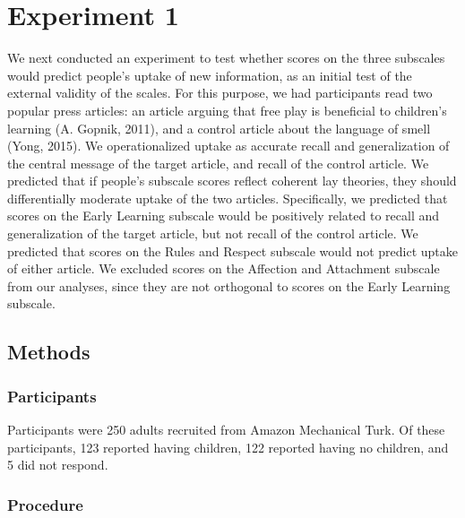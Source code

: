 \documentclass[10pt, letterpaper]{article}
\begin{document}
\section{Experiment 1}\label{experiment-1}

We next conducted an experiment to test whether scores on the three
subscales would predict people's uptake of new information, as an
initial test of the external validity of the scales. For this purpose,
we had participants read two popular press articles: an article arguing
that free play is beneficial to children's learning (A. Gopnik, 2011),
and a control article about the language of smell (Yong, 2015). We
operationalized uptake as accurate recall and generalization of the
central message of the target article, and recall of the control
article. We predicted that if people's subscale scores reflect coherent
lay theories, they should differentially moderate uptake of the two
articles. Specifically, we predicted that scores on the Early Learning
subscale would be positively related to recall and generalization of the
target article, but not recall of the control article. We predicted that
scores on the Rules and Respect subscale would not predict uptake of
either article. We excluded scores on the Affection and Attachment
subscale from our analyses, since they are not orthogonal to scores on
the Early Learning subscale.

\subsection{Methods}\label{methods}

\subsubsection{Participants}\label{participants}

Participants were 250 adults recruited from Amazon Mechanical Turk. Of
these participants, 123 reported having children, 122 reported having no
children, and 5 did not respond.

\subsubsection{Procedure}\label{procedure}
\end{document}

